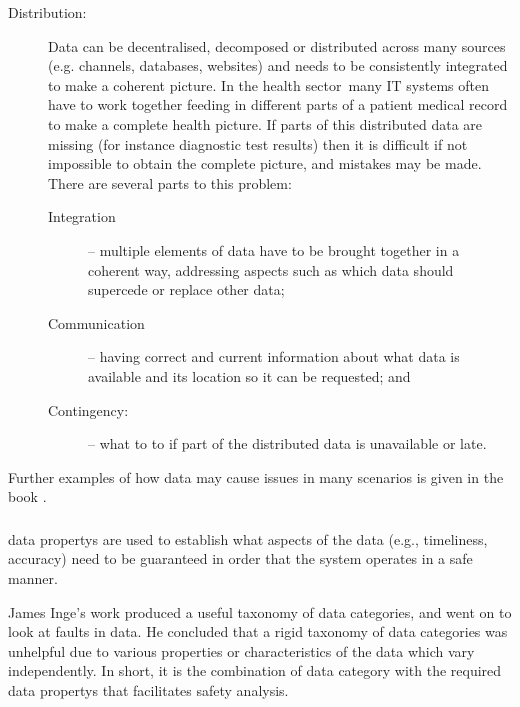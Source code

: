 \begin{description}
\item[Distribution:] Data can be decentralised, decomposed or distributed across many sources (e.g. channels, \glspl{database}, websites) and needs to be consistently integrated to make a coherent picture. In the health sector\cbstart\ many IT systems often \cbend have to work together feeding in different parts of a patient medical record to make a complete health picture. If parts of this distributed data are missing (for instance diagnostic test results) then it is difficult if not impossible to obtain the complete picture, and mistakes may be made.
There are several parts to this problem:
\begin{description}
	\item[Integration] -- multiple elements of data have to be brought together in a coherent way, addressing aspects such as which data should supercede or replace other data;
	\item[Communication] -- having correct and current \gls{information} about what data is available and its location so it can be requested; and
	\item[Contingency:] -- what to to if part of the distributed data is unavailable or late.
\end{description}
\end{description}


Further examples of how data may cause issues in many scenarios is given in \cbstart the book  \cite{citation:datacentric}\cbend.

\subsubsection{}\label{bkm:guidance:dataproperties}
\Glspl{data property} are used to establish what aspects of the data (e.g., \gls{timeliness}, \gls{accuracy}) need to be guaranteed in order that the system operates in a safe manner.

James Inge's work \cite{citation:inge2008improving} produced a useful taxonomy of data categories, and went on to look at faults in data. He concluded that a rigid taxonomy of data categories was unhelpful due to various properties or characteristics of the data which vary independently. In short, it is the combination of data category with the required \glspl{data property} that facilitates safety analysis.

